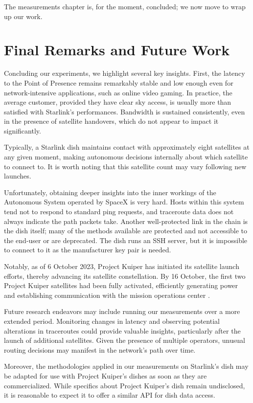 \documentclass[]{report}
\begin{document}
The measurements chapter is, for the moment, concluded; we now move to wrap up our work.


\chapter{Final Remarks and Future Work}

Concluding our experiments, we highlight several key insights. First, the latency to the Point of Presence remains
remarkably stable and low enough even for network-intensive applications, such as online video gaming. In practice, the
average customer, provided they have clear sky access, is usually more than satisfied with Starlink's performances.
Bandwidth is sustained consistently, even in the presence of satellite handovers, which do not appear to impact it
significantly.

Typically, a Starlink dish maintains contact with approximately eight satellites at any given moment, making autonomous
decisions internally about which satellite to connect to. It is worth noting that this satellite count may vary
following new launches.

Unfortunately, obtaining deeper insights into the inner workings of the Autonomous System operated by SpaceX is very
hard. Hosts within this system tend not to respond to standard ping requests, and traceroute data does not always
indicate the path packets take. Another well-protected link in the chain is the dish itself; many of the methods
available are protected and not accessible to the end-user or are deprecated. The dish runs an SSH server, but it is
impossible to connect to it as the manufacturer key pair is needed.

Notably, as of 6 October 2023, Project Kuiper has initiated its satellite launch efforts, thereby advancing its
satellite constellation. By 16 October, the first two Project Kuiper satellites had been fully activated, efficiently
generating power and establishing communication with the mission operations center \cite{kuiplaunches}.

Future research endeavors may include running our measurements over a more extended period. Monitoring changes in
latency and observing potential alterations in traceroutes could provide valuable insights, particularly after the
launch of additional satellites. Given the presence of multiple operators, unusual routing decisions may manifest in the
network's path over time.

Moreover, the methodologies applied in our measurements on Starlink's dish may be adapted for use with Project Kuiper's
dishes as soon as they are commercialized. While specifics about Project Kuiper's dish remain undisclosed, it is
reasonable to expect it to offer a similar API for dish data access.
\end{document}
